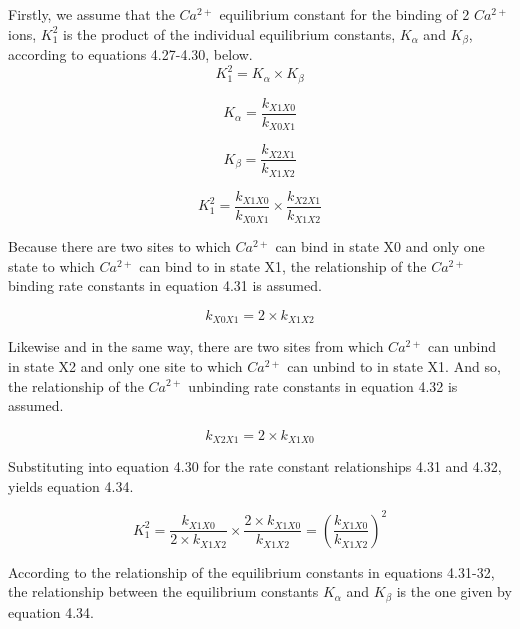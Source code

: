 \documentclass[12pt]{ucsddissertation}
\begin{document}
Firstly, we assume that the $Ca^{2+}$  equilibrium constant for the binding of 2 $Ca^{2+}$ ions, $K_{1}^{2}$ is the product of the individual equilibrium constants, $K_{\alpha}$ and $K_{\beta}$, according to equations 4.27-4.30, below. 
\begin{equation}
K_{1}^{2}= K_{\alpha} \times K_{\beta}
\end{equation}

\begin{equation}
K_{\alpha} = \frac{k_{X1X0}}{k_{X0X1}} 
\end{equation}

\begin{equation}
K_{\beta} = \frac{k_{X2X1}}{k_{X1X2}}
\end{equation}

\begin{equation}
K^{2}_{1}=  \frac{k_{X1X0}}{k_{X0X1}} \times \frac{k_{X2X1}}{k_{X1X2}}
\end{equation}

Because there are two sites to which  $Ca^{2+}$ can bind in state X0 and only one state to which  $Ca^{2+}$ can bind to in state X1, the relationship of the $Ca^{2+}$ binding rate constants in equation 4.31 is assumed. 

\begin{equation}
k_{X0X1}=2 \times k_{X1X2} 
\end{equation}

Likewise and in the same way, there are two sites from which  $Ca^{2+}$ can unbind in state X2 and only one site to which $Ca^{2+}$ can unbind to in state X1. And so, the relationship of the $Ca^{2+}$ unbinding rate constants in equation 4.32 is assumed. 

\begin{equation}
k_{X2X1}=2 \times k_{X1X0} 
\end{equation} 

Substituting into equation 4.30 for the rate constant relationships 4.31 and 4.32, yields equation 4.34.

\begin{equation}
K^{2}_{1}=  \frac{k_{X1X0}}{2 \times k_{X1X2}} \times \frac{2 \times k_{X1X0}}{k_{X1X2}} = \left(\frac{k_{X1X0}}{k_{X1X2}}\right)^{2}
\end{equation}

According to the relationship of the equilibrium constants in equations 4.31-32, the relationship between the equilibrium constants $K_{\alpha}$ and $K_{\beta}$ is the one given by equation 4.34.
\end{document}
